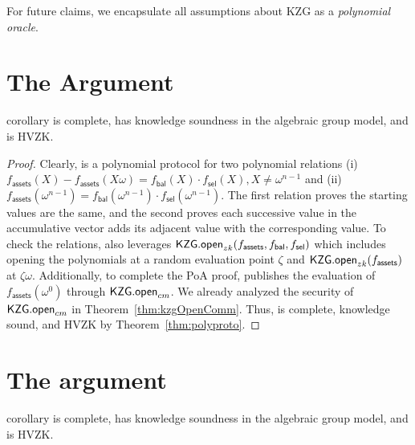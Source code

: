For future claims, we encapsulate all assumptions about KZG as a \textit{polynomial oracle}. 


\section{The \poa Argument}

\begin{restatable}{corollary}{}
\label{thm:assets} 
\poa is complete, has knowledge soundness in the algebraic group model, and is HVZK. 
\end{restatable}

\begin{proof}
Clearly, \poa is a polynomial protocol for two polynomial relations (i) $f_\mathsf{assets}(X)-f_\mathsf{assets}(X\omega)=f_\mathsf{bal}(X)\cdot{f_\mathsf{sel}}(X),X\ne{\omega^{n-1}}$ and (ii) $f_\mathsf{assets}(\omega^{n-1})=f_\mathsf{bal}(\omega^{n-1})\cdot{f_\mathsf{sel}}(\omega^{n-1})$. The first relation proves the starting values are the same, and the second proves each successive value in the accumulative vector adds its adjacent value with the corresponding value. To check the relations, \poa also leverages $\mathsf{KZG.open}_{zk}(f_\mathsf{assets},f_\mathsf{bal},f_\mathsf{sel})$ which includes opening the polynomials at a random evaluation point $\zeta$ and $\mathsf{KZG.open}_{zk}(f_\mathsf{assets})$ at $\zeta\omega$. Additionally, to complete the PoA proof, \poa publishes the evaluation of $f_\mathsf{assets}(\omega^0)$ through $\mathsf{KZG.open}_{cm}$. We already analyzed the security of $\mathsf{KZG.open}_{cm}$ in Theorem~\ref{thm:kzgOpenComm}. Thus, \poa is complete, knowledge sound, and HVZK by Theorem~\ref{thm:polyproto}.
\end{proof}


\section{The \pol argument}

\begin{restatable}{corollary}{}
\label{thm:liabilities} 
\pol is complete, has knowledge soundness in the algebraic group model, and is HVZK. 
\end{restatable}

